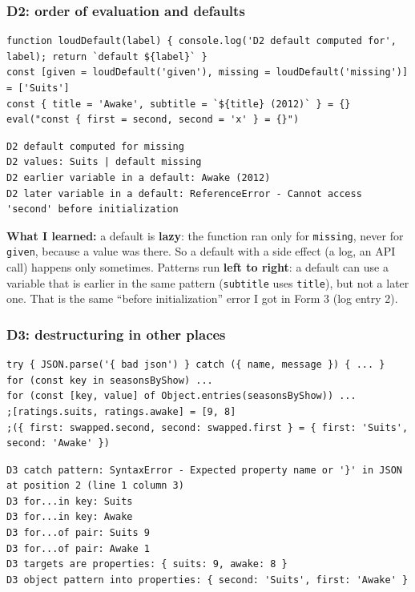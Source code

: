 \documentclass[
  10pt,
]{article}
\newcommand{\passthrough}[1]{#1}
\begin{document}
\hypertarget{d2-order-of-evaluation-and-defaults}{%
\subsubsection{D2: order of evaluation and
defaults}\label{d2-order-of-evaluation-and-defaults}}

\begin{lstlisting}
function loudDefault(label) { console.log('D2 default computed for', label); return `default ${label}` }
const [given = loudDefault('given'), missing = loudDefault('missing')] = ['Suits']
const { title = 'Awake', subtitle = `${title} (2012)` } = {}
eval("const { first = second, second = 'x' } = {}")
\end{lstlisting}

\begin{lstlisting}
D2 default computed for missing
D2 values: Suits | default missing
D2 earlier variable in a default: Awake (2012)
D2 later variable in a default: ReferenceError - Cannot access 'second' before initialization
\end{lstlisting}

\textbf{What I learned:} a default is \textbf{lazy}: the function ran
only for \passthrough{\lstinline!missing!}, never for
\passthrough{\lstinline!given!}, because a value was there. So a default
with a side effect (a log, an API call) happens only sometimes. Patterns
run \textbf{left to right}: a default can use a variable that is earlier
in the same pattern (\passthrough{\lstinline!subtitle!} uses
\passthrough{\lstinline!title!}), but not a later one. That is the same
``before initialization'' error I got in Form 3 (log entry 2).

\hypertarget{d3-destructuring-in-other-places}{%
\subsubsection{D3: destructuring in other
places}\label{d3-destructuring-in-other-places}}

\begin{lstlisting}
try { JSON.parse('{ bad json') } catch ({ name, message }) { ... }
for (const key in seasonsByShow) ...
for (const [key, value] of Object.entries(seasonsByShow)) ...
;[ratings.suits, ratings.awake] = [9, 8]
;({ first: swapped.second, second: swapped.first } = { first: 'Suits', second: 'Awake' })
\end{lstlisting}

\begin{lstlisting}
D3 catch pattern: SyntaxError - Expected property name or '}' in JSON at position 2 (line 1 column 3)
D3 for...in key: Suits
D3 for...in key: Awake
D3 for...of pair: Suits 9
D3 for...of pair: Awake 1
D3 targets are properties: { suits: 9, awake: 8 }
D3 object pattern into properties: { second: 'Suits', first: 'Awake' }
\end{lstlisting}
\end{document}
